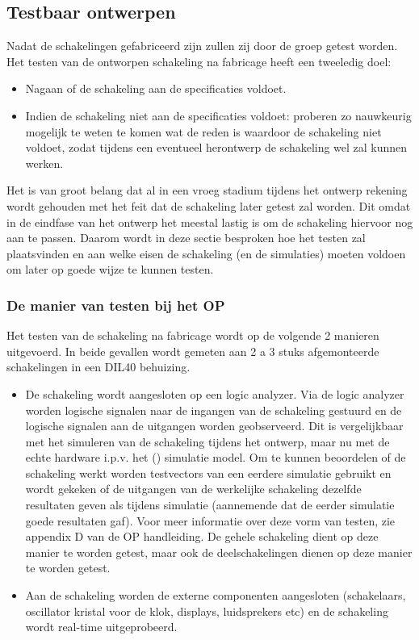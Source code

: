 \subsection{Testbaar ontwerpen}
\label{testbaar}
Nadat de schakelingen gefabriceerd zijn zullen zij door de groep getest worden. 
Het testen van de ontworpen schakeling na fabricage heeft een tweeledig doel: 
\begin{itemize}
\item
Nagaan of de schakeling aan de specificaties voldoet.
\item
Indien de schakeling niet aan de specificaties voldoet: 
proberen zo nauwkeurig mogelijk te weten te komen wat de reden is waardoor 
de schakeling niet voldoet,
zodat tijdens een eventueel herontwerp de schakeling wel zal kunnen werken.
\end{itemize}
Het is van groot belang dat al in een vroeg stadium tijdens het ontwerp
rekening wordt gehouden met het feit dat de schakeling later getest zal
worden.
Dit omdat in de eindfase van het ontwerp het meestal lastig is om de 
schakeling hiervoor nog aan te passen.
Daarom wordt in deze sectie besproken hoe het testen zal plaatsvinden
en aan welke eisen de schakeling (en de simulaties) moeten voldoen
om later op goede wijze te kunnen testen.

\subsubsection{De manier van testen bij het OP}
Het testen van de schakeling na fabricage wordt op de volgende 2 manieren uitgevoerd.  
In beide gevallen wordt gemeten aan 2 a 3 stuks afgemonteerde schakelingen in een DIL40 behuizing. 
\begin{itemize}
\item
De schakeling wordt aangesloten op een logic analyzer.
Via de logic analyzer worden logische signalen naar de ingangen van de
schakeling gestuurd en de logische signalen aan de uitgangen worden geobserveerd. 
Dit is vergelijkbaar met het simuleren van de schakeling tijdens het ontwerp,
maar nu met de echte hardware i.p.v. het () simulatie model.
Om te kunnen beoordelen of de schakeling werkt worden testvectors van 
een eerdere  simulatie gebruikt en wordt gekeken of de uitgangen 
van de werkelijke schakeling dezelfde resultaten geven als tijdens simulatie 
(aannemende dat de eerder  simulatie goede resultaten gaf).
Voor meer informatie over deze vorm van testen, zie appendix D van de OP handleiding.
De gehele schakeling dient op deze manier te worden getest, maar ook
de deelschakelingen dienen op deze
manier te worden getest.
\item
Aan de schakeling worden
de externe componenten aangesloten 
(schakelaars, oscillator kristal voor de klok, displays, luidsprekers etc) 
en de schakeling wordt real-time uitgeprobeerd.
\end{itemize}
